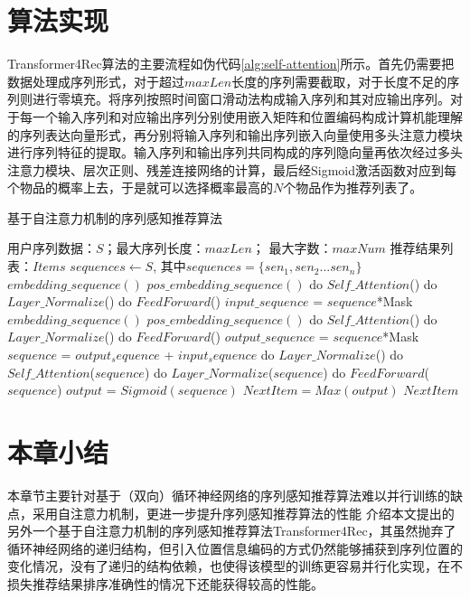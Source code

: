 \section{算法实现}
Transformer4Rec算法的主要流程如伪代码\ref{alg:self-attention}所示。首先仍需要把数据处理成序列形式，对于超过$maxLen$长度的序列需要截取，对于长度不足的序列则进行零填充。将序列按照时间窗口滑动法构成输入序列和其对应输出序列。对于每一个输入序列和对应输出序列分别使用嵌入矩阵和位置编码构成计算机能理解的序列表达向量形式，再分别将输入序列和输出序列嵌入向量使用多头注意力模块进行序列特征的提取。输入序列和输出序列共同构成的序列隐向量再依次经过多头注意力模块、层次正则、残差连接网络的计算，最后经Sigmoid激活函数对应到每个物品的概率上去，于是就可以选择概率最高的$N$个物品作为推荐列表了。
\begin{algorithm}[htbp]
	\caption{基于自注意力机制的序列感知推荐算法}
	\label{alg:self-attention}
		\begin{algorithmic}[1]
			\REQUIRE 用户序列数据：$S$；最大序列长度：$maxLen$； 最大字数：$maxNum$
			\ENSURE 推荐结果列表：$Items$
			\STATE $sequences \leftarrow S$, 其中$sequences=\{sen_{1}, sen_{2}...sen_{n}\}$ 
			    \STATE $embedding\_sequence()$
			    \STATE $pos\_embedding\_sequence()$
					    \STATE do $Self\_Attention$()
					    \STATE do $Layer\_Normalize$()
					    \STATE do $FeedForward$()
					    \STATE $input\_sequence$ = $sequence$*Mask
					\ENDFOR
			\ENDFOR
			    \STATE $embedding\_sequence()$
			    \STATE $pos\_embedding\_sequence()$
					    \STATE do $Self\_Attention$()
					    \STATE do $Layer\_Normalize$()
					    \STATE do $FeedForward$()
					    \STATE $output\_sequence$ = $sequence$*Mask
					\ENDFOR
			\ENDFOR
			\STATE $sequence$ = $output_sequence$ + $input_sequence$
			\STATE do $Layer\_Normalize$()
			    \STATE do $Self\_Attention$($sequence$)
			    \STATE do $Layer\_Normalize$($sequence$)
			    \STATE do $FeedForward$($sequence$)
			\ENDFOR
			\STATE $output$ = $Sigmoid(sequence)$
			\STATE $NextItem = Max(output) $
			\RETURN $NextItem$
		\end{algorithmic}
\end{algorithm}


\section{本章小结}

本章节主要针对基于（双向）循环神经网络的序列感知推荐算法难以并行训练的缺点，采用自注意力机制，更进一步提升序列感知推荐算法的性能
介绍本文提出的另外一个基于自注意力机制的序列感知推荐算法Transformer4Rec，其虽然抛弃了循环神经网络的递归结构，但引入位置信息编码的方式仍然能够捕获到序列位置的变化情况，没有了递归的结构依赖，也使得该模型的训练更容易并行化实现，在不损失推荐结果排序准确性的情况下还能获得较高的性能。

